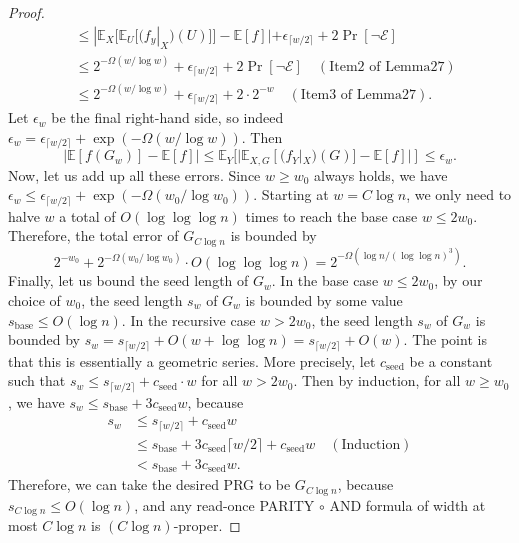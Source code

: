 \documentclass[10pt,a4paper]{article}
\begin{document}
\begin{proof}
\begin{align*}
&\le|\mathbb E_X[\mathbb E_U[(f_y|_X)(U)]]-\mathbb E[f]|
+\epsilon_{\lceil w/2\rceil}+2\Pr[\neg\mathcal E]\\
&\le2^{-\Omega(w/\log w)}+\epsilon_{\lceil w/2\rceil}+2\Pr[\neg\mathcal E]\quad(\text{Item2 of Lemma27})\\
&\le2^{-\Omega(w/\log w)}+\epsilon_{\lceil w/2\rceil}+2\cdot2^{-w}\quad(\text{Item3 of Lemma27}).
\end{align*}
Let $\epsilon_w$ be the final right-hand side, so indeed $\epsilon_w=\epsilon_{\lceil w/2\rceil}+\exp(-\Omega(w/\log w))$. Then
\[
|\mathbb E[f(G_w)]-\mathbb E[f]|
\le\mathbb E_Y[|\mathbb E_{X,G}[(f_Y|_X)(G)]-\mathbb E[f]|]\le\epsilon_w.
\]
Now, let us add up all these errors. Since $w\ge w_0$ always holds, we have $\epsilon_w\le\epsilon_{\lceil w/2\rceil}+\exp(-\Omega(w_0/\log w_0))$. Starting at $w=C\log n$, we only need to halve $w$ a total of $O(\log\log\log n)$ times to reach the base case $w\le2w_0$. Therefore, the total error of $G_{C\log n}$ is bounded by
\[
2^{-w_0}+2^{-\Omega(w_0/\log w_0)}\cdot O(\log\log\log n)
=2^{-\Omega(\log n/(\log\log n)^3)}.
\]
Finally, let us bound the seed length of $G_w$. In the base case $w\le2w_0$, by our choice of $w_0$, the seed length $s_w$ of $G_w$ is bounded by some value $s_{\mathrm{base}}\le O(\log n)$. In the recursive case $w>2w_0$, the seed length $s_w$ of $G_w$ is bounded by
$s_w=s_{\lceil w/2\rceil}+O(w+\log\log n)=s_{\lceil w/2\rceil}+O(w)$.
The point is that this is essentially a geometric series. More precisely, let $c_{\mathrm{seed}}$ be a constant such that $s_w\le s_{\lceil w/2\rceil}+c_{\mathrm{seed}}\cdot w$ for all $w>2w_0$. Then by induction, for all $w\ge w_0$, we have $s_w\le s_{\mathrm{base}}+3c_{\mathrm{seed}}w$, because
\begin{align*}
s_w&\le s_{\lceil w/2\rceil}+c_{\mathrm{seed}}w\\
&\le s_{\mathrm{base}}+3c_{\mathrm{seed}}\lceil w/2\rceil+c_{\mathrm{seed}}w\quad(\text{Induction})\\
&<s_{\mathrm{base}}+3c_{\mathrm{seed}}w.
\end{align*}
Therefore, we can take the desired PRG to be $G_{C\log n}$, because $s_{C\log n}\le O(\log n)$, and any read-once PARITY $\circ$ AND formula of width at most $C\log n$ is $(C\log n)$-proper.
\end{proof}
\end{document}

